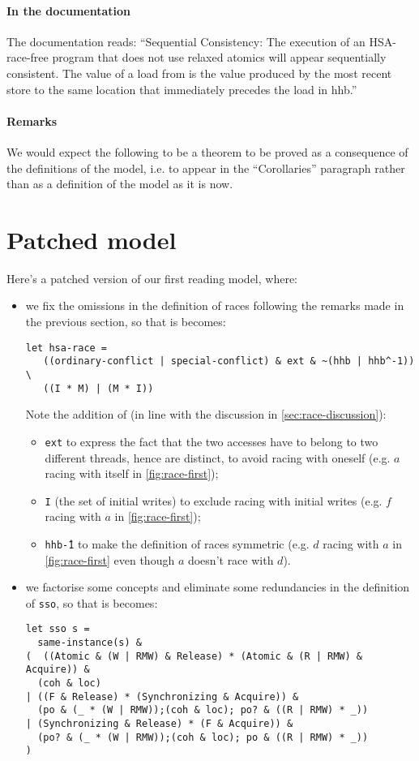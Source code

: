 \documentclass[a4paper]{article}
\begin{document}
\paragraph{In the documentation}
The documentation reads: ``Sequential Consistency: The execution of an
HSA-race-free program that does not use relaxed atomics will appear
sequentially consistent. The value of a load from is the value produced by the
most recent store to the same location that immediately precedes the load in
hhb.'' 

\paragraph{Remarks}
We would expect the following to be a theorem to be proved as a consequence of
the definitions of the model, i.e. to appear in the ``Corollaries'' paragraph
rather than as a definition of the model as it is now.

\clearpage

\section{Patched model \label{sec:fixes}}

Here's a patched version of our first reading model, where:
\begin{itemize}
\item we fix the omissions in the definition of races following the
remarks made in the previous section, so that is becomes:
\begin{verbatim}
let hsa-race =
   ((ordinary-conflict | special-conflict) & ext & ~(hhb | hhb^-1)) \
   ((I * M) | (M * I))
\end{verbatim}
{\color{blue} Note the addition of (in line with the discussion in \mysec\ref{sec:race-discussion}):
  \begin{itemize}
  \item {\tt ext} to express the fact that the two accesses have to belong to
two different threads, hence are distinct, to avoid racing with oneself (e.g.
$a$ racing with itself in \myfig\ref{fig:race-first});
  \item {\tt I} (the set of initial writes) to exclude racing with initial
writes (e.g. $f$ racing with $a$ in \myfig\ref{fig:race-first});
  \item {\tt hhb\^-1} to make the definition of races symmetric (e.g. $d$
racing with $a$ in \myfig\ref{fig:race-first} even though $a$ doesn't race with
$d$).
\end{itemize} }
\item we factorise some concepts and eliminate some redundancies in the
definition of {\tt sso}, so that is becomes:
\begin{verbatim}
let sso s =
  same-instance(s) &
(  ((Atomic & (W | RMW) & Release) * (Atomic & (R | RMW) & Acquire)) &
  (coh & loc)
| ((F & Release) * (Synchronizing & Acquire)) &
  (po & (_ * (W | RMW));(coh & loc); po? & ((R | RMW) * _))
| (Synchronizing & Release) * (F & Acquire)) &
  (po? & (_ * (W | RMW));(coh & loc); po & ((R | RMW) * _))
)
\end{verbatim}
\end{itemize}
\end{document}
